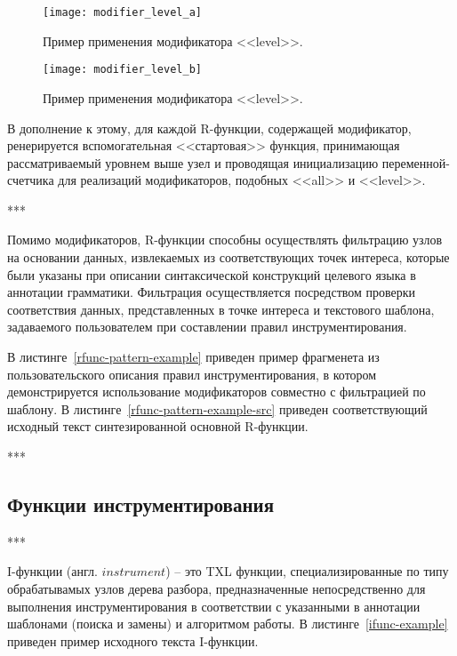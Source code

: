 \begin{figure}[!h]
	\centering
	\texttt{[image: modifier\_level\_a]}
	\caption{Пример применения модификатора <<level>>.}
	\label{fig:modifier_level_a}
\end{figure}

\begin{figure}[!h]
	\centering
	\texttt{[image: modifier\_level\_b]}
	\caption{Пример применения модификатора <<level>>.}
	\label{fig:modifier_level_b}
\end{figure}

В дополнение к этому, для каждой R-функции, содержащей модификатор, ренерируется вспомогательная <<стартовая>> функция, принимающая рассматриваемый уровнем выше узел и проводящая инициализацию переменной-счетчика для реализаций модификаторов, подобных <<all>> и <<level>>.

***

Помимо модификаторов, R-функции способны осуществлять фильтрацию узлов на основании данных, извлекаемых из соответствующих точек интереса, которые были указаны при описании синтаксической конструкций целевого языка в аннотации грамматики.
Фильтрация осуществляется посредством проверки соответствия данных, представленных в точке интереса и текстового шаблона, задаваемого пользователем при составлении правил инструментирования.

В листинге~\ref{rfunc-pattern-example} приведен пример фрагменета из пользовательского описания правил инструментирования, в котором демонстрируется использование модификаторов совместно с фильтрацией по шаблону.
В листинге~\ref{rfunc-pattern-example-src} приведен соответствующий исходный текст синтезированной основной R-функции.

***

\subsection{Функции инструментирования}

***

I-функции (англ. $instrument$) -- это TXL функции, специализированные по типу обрабатывамых узлов дерева разбора, предназначенные непосредственно для выполнения инструментирования в соответствии с указанными в аннотации шаблонами (поиска и замены) и алгоритмом работы.
В листинге~\ref{ifunc-example} приведен пример исходного текста I-функции.

